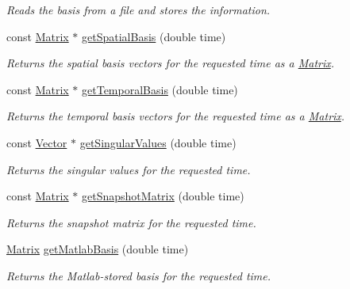 \begin{DoxyCompactItemize}
\begin{DoxyCompactList}\small\item\em Reads the basis from a file and stores the information. \end{DoxyCompactList}\item 
const \hyperlink{class_c_a_r_o_m_1_1_matrix}{Matrix} $\ast$ \hyperlink{class_c_a_r_o_m_1_1_basis_reader_a4e876f4494ba2e62e6f153b78038e297}{get\-Spatial\-Basis} (double time)
\begin{DoxyCompactList}\small\item\em Returns the spatial basis vectors for the requested time as a \hyperlink{class_c_a_r_o_m_1_1_matrix}{Matrix}. \end{DoxyCompactList}\item 
const \hyperlink{class_c_a_r_o_m_1_1_matrix}{Matrix} $\ast$ \hyperlink{class_c_a_r_o_m_1_1_basis_reader_a8d8b2e71aeeb7b16519ee5e9a5722ea6}{get\-Temporal\-Basis} (double time)
\begin{DoxyCompactList}\small\item\em Returns the temporal basis vectors for the requested time as a \hyperlink{class_c_a_r_o_m_1_1_matrix}{Matrix}. \end{DoxyCompactList}\item 
const \hyperlink{class_c_a_r_o_m_1_1_vector}{Vector} $\ast$ \hyperlink{class_c_a_r_o_m_1_1_basis_reader_a7f634aee36bea05e8b7a8967d3ff1ea4}{get\-Singular\-Values} (double time)
\begin{DoxyCompactList}\small\item\em Returns the singular values for the requested time. \end{DoxyCompactList}\item 
const \hyperlink{class_c_a_r_o_m_1_1_matrix}{Matrix} $\ast$ \hyperlink{class_c_a_r_o_m_1_1_basis_reader_ac8d91a7b3cf324f4ecda28e0160aec66}{get\-Snapshot\-Matrix} (double time)
\begin{DoxyCompactList}\small\item\em Returns the snapshot matrix for the requested time. \end{DoxyCompactList}\item 
\hyperlink{class_c_a_r_o_m_1_1_matrix}{Matrix} \hyperlink{class_c_a_r_o_m_1_1_basis_reader_abe480f59f6f5b2706f842f8ad3903650}{get\-Matlab\-Basis} (double time)
\begin{DoxyCompactList}\small\item\em Returns the Matlab-\/stored basis for the requested time. \end{DoxyCompactList}\end{DoxyCompactItemize}


